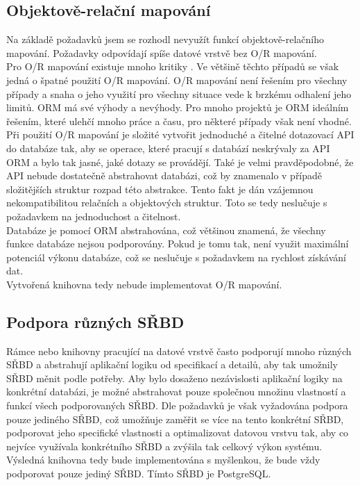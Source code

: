 \documentclass[ing,male,java,dept456]{diploma}						%
\begin{document}
\subsection{Objektově-relační mapování}

Na základě požadavků jsem se rozhodl nevyužít funkcí objektově-relačního mapování. Požadavky odpovídají spíše datové vrstvě bez O/R mapování. \\
Pro O/R mapování existuje mnoho kritiky \cite{seldo, fowler-orm, dbprogrammer-orm, mehdi}. Ve většině těchto případů se však jedná o špatné použití O/R mapování. O/R mapování není řešením pro všechny případy a snaha o jeho využití pro všechny situace vede k brzkému odhalení jeho limitů. ORM má své výhody a nevýhody. Pro mnoho projektů je ORM ideálním řešením, které ulehčí mnoho práce a času, pro některé případy však není vhodné. \\
Při použití O/R mapování je složité vytvořit jednoduché a čitelné dotazovací API do databáze tak, aby se operace, které pracují s databází neskrývaly za API ORM a bylo tak jasné, jaké dotazy se provádějí. Také je velmi pravděpodobné, že API nebude dostatečně abstrahovat databázi, což by znamenalo v případě složitějších struktur rozpad této abstrakce. Tento fakt je dán vzájemnou nekompatibilitou relačních a objektových struktur. Toto se tedy neslučuje s požadavkem na jednoduchost a čitelnost. \\
Databáze je pomocí ORM abstrahována, což většinou znamená, že všechny funkce databáze nejsou podporovány. Pokud je tomu tak, není využit maximální potenciál výkonu databáze, což se neslučuje s požadavkem na rychlost získávání dat. \\
Vytvořená knihovna tedy nebude implementovat O/R mapování. 

\subsection{Podpora různých SŘBD}

Rámce nebo knihovny pracující na datové vrstvě často podporují mnoho různých SŘBD a abstrahují aplikační logiku od specifikací a detailů, aby tak umožnily SŘBD měnit podle potřeby. Aby bylo dosaženo nezávislosti aplikační logiky na konkrétní databázi, je možné abstrahovat pouze společnou množinu vlastností a funkcí všech podporovaných SŘBD. Dle požadavků je však vyžadována podpora pouze jediného SŘBD, což umožňuje zaměřit se více na tento konkrétní SŘBD, podporovat jeho specifické vlastnosti a optimalizovat datovou vrstvu tak, aby co nejvíce využívala konkrétního SŘBD a zvýšila tak celkový výkon systému. \\
Výsledná knihovna tedy bude implementována s myšlenkou, že bude vždy podporovat pouze jediný SŘBD. Tímto SŘBD je PostgreSQL.
\end{document}
